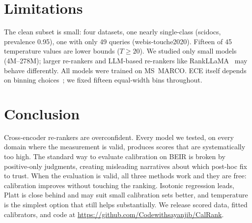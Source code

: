 \documentclass[conference]{IEEEtran}
\begin{document}
\section{Limitations}
\label{sec:limits}

The clean subset is small: four datasets, one nearly single-class (scidocs,
prevalence 0.95), one with only 49 queries (webis-touche2020). Fifteen of 45
temperature values are lower bounds ($T {\geq} 20$). We studied only small
models (4M--278M); larger re-rankers and LLM-based re-rankers like
RankLLaMA~\cite{ma2024rankllama} may behave differently. All models were
trained on MS~MARCO. ECE itself depends on binning choices~\cite{nixon2019};
we fixed fifteen equal-width bins throughout.

\section{Conclusion}
\label{sec:conclusion}

Cross-encoder re-rankers are overconfident. Every model we tested, on every
domain where the measurement is valid, produces scores that are
systematically too high. The standard way to evaluate calibration on BEIR is
broken by positive-only judgments, creating misleading narratives about which
post-hoc fix to trust. When the evaluation is valid, all three methods work
and they are free: calibration improves without touching the ranking.
Isotonic regression leads, Platt is close behind and may suit small
calibration sets better, and temperature is the simplest option that still
helps substantially. We release scored data, fitted calibrators, and code at
\url{https://github.com/Codewithsayanjib/CalRank}.
\end{document}
